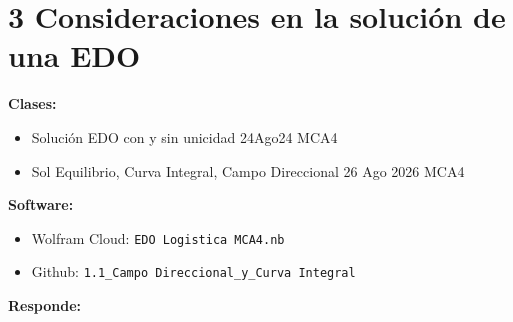 \section{3 Consideraciones en la solución de una EDO}

\begin{tcolorbox}[enunciado]
\textbf{Clases:}
\begin{itemize}[leftmargin=*]
    \item Solución EDO con y sin unicidad 24Ago24 MCA4
    \item Sol Equilibrio, Curva Integral, Campo Direccional 26 Ago 2026 MCA4
\end{itemize}

\textbf{Software:}
\begin{itemize}[leftmargin=*]
    \item Wolfram Cloud: \texttt{EDO Logistica MCA4.nb}
    \item Github: \texttt{1.1\_Campo Direccional\_y\_Curva Integral}
\end{itemize}
\end{tcolorbox}

\vspace{0.3cm}
\textbf{Responde:}

